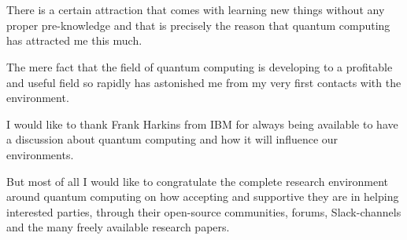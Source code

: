 
\chapter*{}
\label{ch:voorwoord}


There is a certain attraction that comes with learning new things without any proper pre-knowledge and that is precisely the reason that quantum computing has attracted me this much. 

The mere fact that the field of quantum computing is developing to a profitable and useful field so rapidly has astonished me from my very first contacts with the environment.

 I would like to thank Frank Harkins from IBM for always being available to have a discussion about quantum computing and how it will influence our environments. 
 
 But most of all I would like to congratulate the complete research environment around quantum computing on how accepting and supportive they are in helping interested parties, through their open-source communities, forums, Slack-channels and the many freely available research papers.


